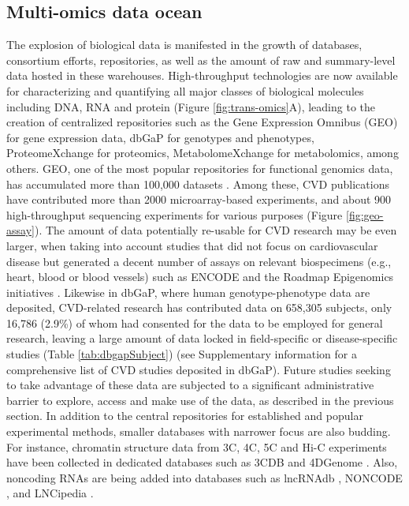 \documentclass[letter]{bioinfo}
\begin{document}
	\subsection*{Multi-omics data ocean}
    The explosion of biological data is manifested in the growth of databases, consortium efforts, repositories, as well as the amount of raw and summary-level data hosted in these warehouses. High-throughput technologies are now available for characterizing and quantifying all major classes of biological molecules including DNA, RNA and protein (Figure \ref{fig:trans-omics}A), leading to the creation of centralized repositories such as the Gene Expression Omnibus (GEO) \citep{Barrett:2013:NCBI} for gene expression data, dbGaP \citep{Tryka:2014:dbGaP} for genotypes and phenotypes, ProteomeXchange \citep{Vizcaino:2014:ProteomeXchange,Deutsch:2017:ProteomeXchange} for proteomics, MetabolomeXchange for metabolomics, among others.  GEO, one of the most popular repositories for functional genomics data, has accumulated more than 100,000 datasets \citep{Zhu:2008:GEOmetadb}. Among these, CVD publications have contributed more than 2000 microarray-based experiments, and about 900 high-throughput sequencing experiments for various purposes (Figure \ref{fig:geo-assay}). The amount of data potentially re-usable for CVD research may be even larger, when taking into account studies that did not focus on cardiovascular disease but generated a decent number of assays on relevant biospecimens (e.g., heart, blood or blood vessels) such as ENCODE \citep{ENCODE:2012:integrated} and the Roadmap Epigenomics initiatives \citep{Roadmap:2015:Integrative}.
	Likewise in dbGaP, where human genotype-phenotype data are deposited, CVD-related research has contributed data on 658,305 subjects, only 16,786 (2.9\%) of whom had consented for the data to be employed for general research, leaving a large amount of data locked in field-specific or disease-specific studies (Table \ref{tab:dbgapSubject}) (see Supplementary information for a comprehensive list of CVD studies deposited in dbGaP). Future studies seeking to take advantage of these data are subjected to a significant administrative barrier to explore, access and make use of the data, as described in the previous section.
	In addition to the central repositories for established and popular experimental methods, smaller databases with narrower focus are also budding. For instance, chromatin structure data from 3C, 4C, 5C and Hi-C experiments have been collected in dedicated databases such as 3CDB \citep{Yun:2016:3CDB} and 4DGenome \citep{Teng:2015:4DGenome}. Also, noncoding RNAs are being added into databases such as lncRNAdb \citep{Quek:2015:lncRNAdb}, NONCODE \citep{Fang:2018:NONCODEV5}, and LNCipedia \citep{Volders:2018:LNCipedia}.
	
\end{document}
